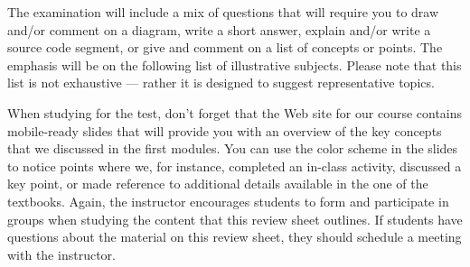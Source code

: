 \documentclass[11pt]{article}
\begin{document}
\noindent The examination will include a mix of questions that will require you
to draw and/or comment on a diagram, write a short answer, explain and/or write
a source code segment, or give and comment on a list of concepts or points. The
emphasis will be on the following list of illustrative subjects. Please note
that this list is not exhaustive --- rather it is designed to suggest
representative topics.

When studying for the test, don't forget that the Web site for our course
contains mobile-ready slides that will provide you with an overview of the key
concepts that we discussed in the first modules. You can use the color scheme in
the slides to notice points where we, for instance, completed an in-class
activity, discussed a key point, or made reference to additional details
available in the one of the textbooks. Again, the instructor encourages students
to form and participate in groups when studying the content that this review
sheet outlines. If students have questions about the material on this review
sheet, they should schedule a meeting with the instructor.
\end{document}

